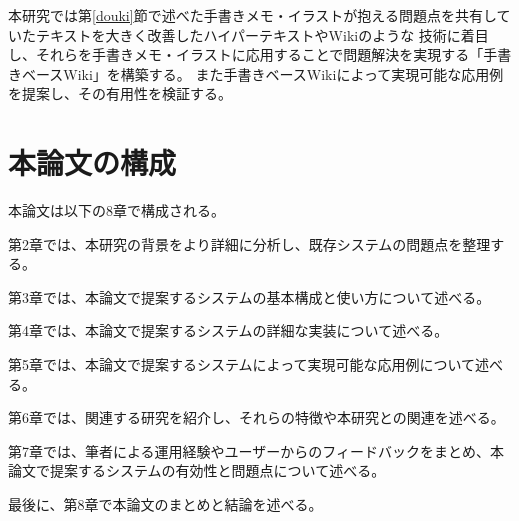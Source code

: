 本研究では第\ref{douki}節で述べた手書きメモ・イラストが抱える問題点を共有していたテキストを大きく改善したハイパーテキストやWikiのような
技術に着目し、それらを手書きメモ・イラストに応用することで問題解決を実現する「手書きベースWiki」を構築する。
また手書きベースWikiによって実現可能な応用例を提案し、その有用性を検証する。

\newpage

\section{本論文の構成}

本論文は以下の8章で構成される。

第2章では、本研究の背景をより詳細に分析し、既存システムの問題点を整理する。

第3章では、本論文で提案するシステムの基本構成と使い方について述べる。

第4章では、本論文で提案するシステムの詳細な実装について述べる。

第5章では、本論文で提案するシステムによって実現可能な応用例について述べる。

第6章では、関連する研究を紹介し、それらの特徴や本研究との関連を述べる。

第7章では、筆者による運用経験やユーザーからのフィードバックをまとめ、本論文で提案するシステムの有効性と問題点について述べる。

最後に、第8章で本論文のまとめと結論を述べる。